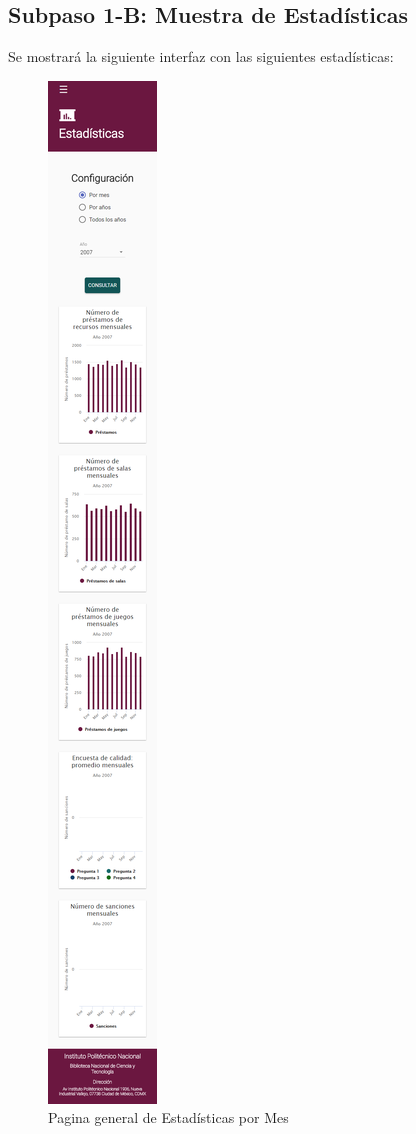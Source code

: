 \subsection{Subpaso 1-B: Muestra de Estadísticas}
	Se mostrará la siguiente interfaz con las siguientes estadísticas:
	\begin{figure}[hbtp]
		\includegraphics[scale=0.3]{images/InterfazMovil/IUGS15_estadisticasMes.PNG}
		\caption{Pagina general de Estadísticas por Mes}
	\end{figure}	
	
